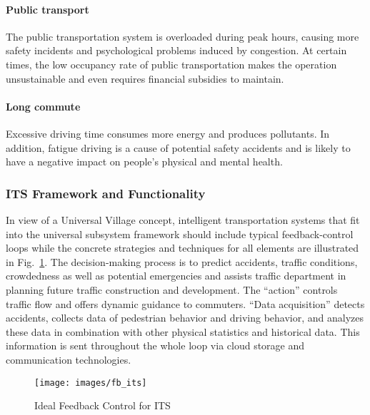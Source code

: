 \documentclass[letterpaper, twocolumn, 10pt, conference]{IEEEtran}
\begin{document}
\paragraph{Public transport}


The public transportation system is overloaded during peak hours, causing more safety incidents and psychological problems induced by congestion. At certain times, the low occupancy rate of public transportation makes the operation unsustainable and even requires financial subsidies to maintain.


\paragraph{Long commute}


Excessive driving time consumes more energy and produces pollutants. In addition, fatigue driving is a cause of potential safety accidents and is likely to have a negative impact on people's physical and mental health.




\subsubsection{ITS Framework and Functionality}
\label{sssec:gwy:ITS:framework}

In view of a Universal Village concept, intelligent transportation systems that fit into the universal subsystem framework should include typical feedback-control loops while the concrete strategies and techniques for all elements are illustrated in Fig.~\ref{fig:gwy:ITS_feedback}. 
The decision-making process is to predict accidents, traffic conditions, crowdedness as well as potential emergencies and assists traffic department in planning future traffic construction and development. The \enquote{action} controls traffic flow and offers dynamic guidance to commuters. \enquote{Data acquisition} detects accidents, collects data of pedestrian behavior and driving behavior, and analyzes these data in combination with other physical statistics and historical data. 
This information is sent throughout the whole loop via cloud storage and communication technologies.



\begin{figure}[h!]
        \centering
        \texttt{[image: images/fb\_its]}
        \caption{Ideal Feedback Control for ITS}
        \label{fig:gwy:ITS_feedback}
\end{figure}
\end{document}
